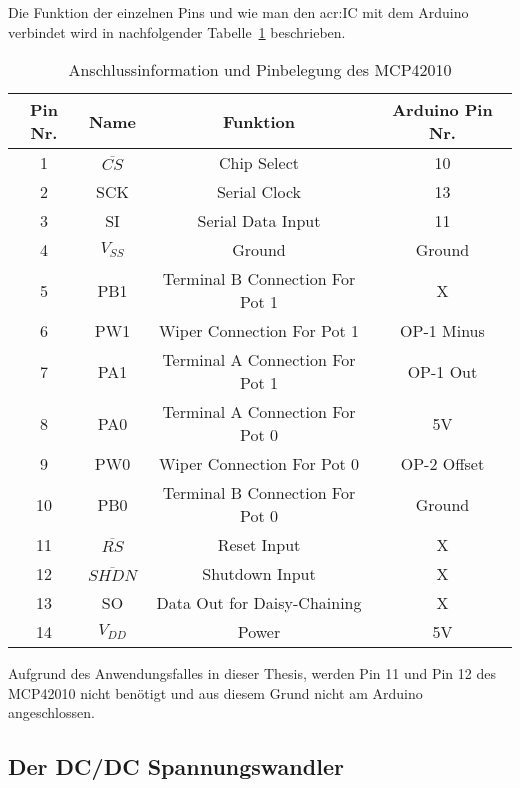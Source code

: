 Die Funktion der einzelnen Pins und wie man den \gls{acr:IC} mit dem Arduino verbindet wird in nachfolgender Tabelle~\ref{tab:pinmcp} beschrieben. 
\begin{table}[htb]
	\begin{center}
		\begin{tabular}[H]{cccc}	
			\toprule
			\textbf{Pin Nr.} & \textbf{Name}  &\textbf{Funktion} & \textbf{Arduino Pin Nr.} \\
			\midrule
			1 & $\overline{CS}$ & Chip Select &  10 \\
			2 & SCK & Serial Clock &  13 \\
			3 & SI & Serial Data Input&  11 \\
			4 & $V_{SS}$ & Ground &  Ground \\
			5 & PB1 & Terminal B Connection For Pot 1 & X \\
			6 & PW1 & Wiper Connection For Pot 1 &  OP-1 Minus \\
			7 & PA1& Terminal A Connection For Pot 1 &  OP-1 Out  \\
			8 & PA0& Terminal A Connection For Pot 0 &  5V \\
			9 & PW0& Wiper Connection For Pot 0 & OP-2 Offset \\
			10 & PB0 & Terminal B Connection For Pot 0 &  Ground \\
			11 & $\overline{RS}$ & Reset Input & X  \\
			12 & $\overline{SHDN}$ & Shutdown Input &X\\
			13 & SO & Data Out for Daisy-Chaining & X \\
			14 & $V_{DD}$ & Power & 5V \\
			\bottomrule
		\end{tabular}
		\caption{Anschlussinformation und Pinbelegung des MCP42010}
		\label{tab:pinmcp}
	\end{center}
\end{table}
Aufgrund des Anwendungsfalles in dieser Thesis, werden Pin 11 und Pin 12 des MCP42010 nicht benötigt und aus diesem Grund nicht am Arduino angeschlossen. 

\subsection{Der DC/DC Spannungswandler}
\label{subsec:Unterabschnitt12}


